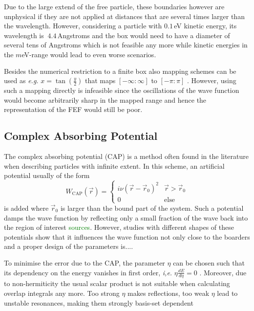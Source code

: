 Due to the large extend of the free particle, these boundaries however are unphysical if they are not applied at distances that are several times larger than the wavelength.
However, considering a particle with $0.1\,$eV kinetic energy, its wavelength is $~4.4\,$Angstroms and the box would need to have a diameter of several tens of Angstroms which is not feasible any more while kinetic energies in the $m$eV-range would lead to even worse scenarios.

Besides the numerical restriction to a finite box also mapping schemes can be used as \textit{e.g.} $x=\tan (\frac y2)$ that maps $[-\infty:\infty]$ to $[-\pi:\pi]$ \cite{PSbook}.
However, using such a mapping directly is infeasible since the oscillations of the wave function would become arbitrarily sharp in the mapped range and hence the representation of the FEF would still be poor.

\subsection{Complex Absorbing Potential}
\label{ch:cap}
The complex absorbing potential (CAP) is a method often found in the literature when describing particles with infinite extent\cite{bauch1, bauch2}.
In this scheme, an artificial potential usually of the form
\begin{equation}
   W_\text{CAP}(\vec{r})=\begin{cases} i\nu(\vec{r}-\vec{r}_0)^2 & \vec{r}>\vec{r}_0 \\
                                           0    & \text{else} \end{cases}
\end{equation}
is added where $\vec{r}_0$ is larger than the bound part of the system.
Such a potential damps the wave function by reflecting only a small fraction of the wave back into the region of interest \textcolor{green}{sources}.
However, studies with different shapes of these potentials show that it influences the wave function not only close to the boarders and a proper design of the parameters is....

To minimise the error due to the CAP, the parameter $\eta$ can be chosen such that its dependency on the energy vanishes in first order, \textit{i,e.} $\eta\frac{dE}{d\eta}=0$ \cite{CAPccEOM}.
Moreover, due to non-hermiticity the usual scalar product is not suitable when calculating overlap integrals any more.
Too strong $\eta$ makes reflections, too weak $\eta$ lead to unstable resonances, making them strongly basis-set dependent \cite{CAPfreshlook}

